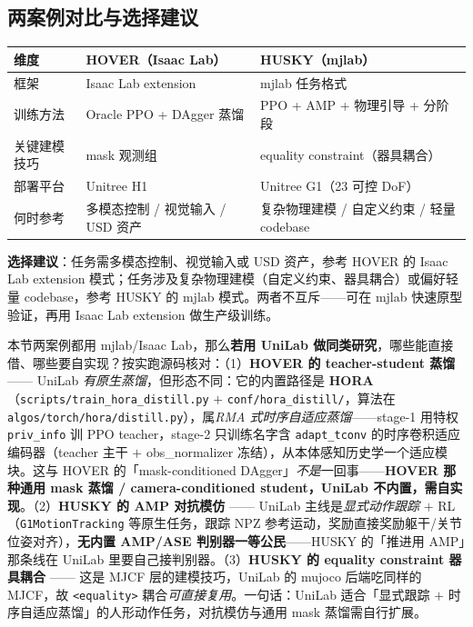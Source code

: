 \subsection{两案例对比与选择建议}
\label{sec:rlmc-diy-cases-compare}

\begin{center}
\small
\begin{tabular}{@{}lp{4.6cm}p{4.6cm}@{}}
\toprule
维度 & HOVER（Isaac Lab） & HUSKY（mjlab） \\
\midrule
框架 & Isaac Lab extension & mjlab 任务格式 \\
训练方法 & Oracle PPO + DAgger 蒸馏 & PPO + AMP + 物理引导 + 分阶段 \\
关键建模技巧 & mask 观测组 & equality constraint（器具耦合） \\
部署平台 & Unitree H1 & Unitree G1（23 可控 DoF） \\
何时参考 & 多模态控制 / 视觉输入 / USD 资产 & 复杂物理建模 / 自定义约束 / 轻量 codebase \\
\bottomrule
\end{tabular}
\end{center}

\textbf{选择建议}：任务需多模态控制、视觉输入或 USD 资产，参考 HOVER 的 Isaac Lab extension 模式；任务涉及复杂物理建模（自定义约束、器具耦合）或偏好轻量 codebase，参考 HUSKY 的 mjlab 模式。两者不互斥——可在 mjlab 快速原型验证，再用 Isaac Lab extension 做生产级训练。

\begin{note}
本节两案例都用 mjlab/Isaac Lab，那么\textbf{若用 UniLab 做同类研究}，哪些能直接借、哪些要自实现？按实跑源码核对：（1）\textbf{HOVER 的 teacher-student 蒸馏} —— UniLab \emph{有原生蒸馏}，但形态不同：它的内置路径是 \textbf{HORA}（\verb|scripts/train_hora_distill.py| $+$ \verb|conf/hora_distill/|，算法在 \verb|algos/torch/hora/distill.py|），属\emph{RMA 式时序自适应蒸馏}——stage-1 用特权 \verb|priv_info| 训 PPO teacher，stage-2 只训练名字含 \verb|adapt_tconv| 的时序卷积适应编码器（teacher 主干 $+$ obs\_normalizer 冻结），从本体感知历史学一个适应模块。这与 HOVER 的「mask-conditioned DAgger」\emph{不是}一回事——\textbf{HOVER 那种通用 mask 蒸馏 / camera-conditioned student，UniLab 不内置，需自实现}。（2）\textbf{HUSKY 的 AMP 对抗模仿} —— UniLab 主线是\emph{显式动作跟踪} $+$ RL（\verb|G1MotionTracking| 等原生任务，跟踪 NPZ 参考运动，奖励直接奖励躯干/关节位姿对齐），\textbf{无内置 AMP/ASE 判别器一等公民}——HUSKY 的「推进用 AMP」那条线在 UniLab 里要自己接判别器。（3）\textbf{HUSKY 的 equality constraint 器具耦合} —— 这是 MJCF 层的建模技巧，UniLab 的 mujoco 后端吃同样的 MJCF，故 \verb|<equality>| 耦合\emph{可直接复用}。一句话：UniLab 适合「显式跟踪 $+$ 时序自适应蒸馏」的人形动作任务，对抗模仿与通用 mask 蒸馏需自行扩展。
\end{note}

